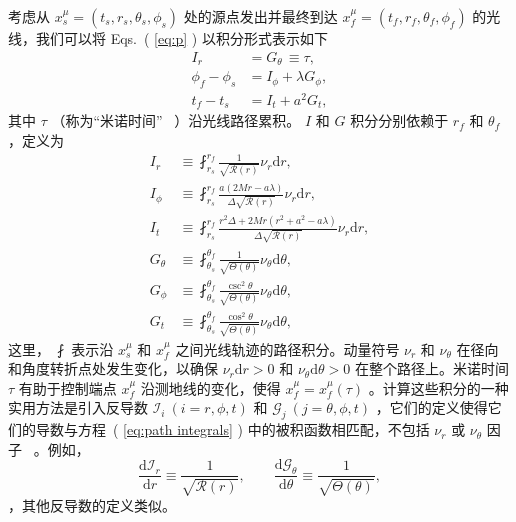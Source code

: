 \documentclass[aps,reprint,superscriptaddress,nofootinbib,floatfix,longbibliography,preprintnumbers]{revtex4-1}
\newcommand{\R}{\mathcal{R}}
\newcommand{\I}{\mathcal{I}}
\newcommand{\G}{\mathcal{G}}
\newcommand{\dd}{\mathrm{d}}
\begin{document}
考虑从    $x^{\mu}_s=(t_s, r_s, \theta_s, \phi_s)$    处的源点发出并最终到达    $x^{\mu}_f=(t_f, r_f, \theta_f, \phi_f)$    的光线，我们可以将 Eqs.~(    \ref{eq:p}    ) 以积分形式表示如下
   \begin{subequations}
    \begin{align}
        I_r&=G_{\theta} \,\equiv\tau,\label{eq:inteq1}  \\ 
        \phi_f-\phi_s&=I_{\phi}+\lambda G_{\phi},\label{eq:inteq2}  \\ 
        t_f-t_s&=I_t +a^2 G_{t}, \label{eq:inteq3}
    \end{align}
\label{eq:integral form}
\end{subequations}    其中    $\tau$    （称为“米诺时间”~    \cite{Mino:2003yg}    ）沿光线路径累积。    $I$    和    $G$    积分分别依赖于    $r_f$    和    $\theta_f$    ，定义为
   \begin{subequations}
    \begin{align}
        I_r&\equiv\fint_{r_s}^{r_f}\frac{1}{\sqrt{\mathcal{R}(r)}}\nu_r\dd r, \label{eq:Ir} \\ 
        I_{\phi}&\equiv\fint_{r_s}^{r_f}\frac{a(2Mr-a\lambda)}{\Delta\sqrt{\R(r)}}\nu_r\dd r, \label{eq:Iphi} \\ 
        I_{t}&\equiv\fint_{r_s}^{r_f}\frac{r^2\Delta+2Mr(r^2+a^2-a\lambda)}{\Delta\sqrt{\R(r)}}\nu_r\dd r, \label{eq:It} \\ 
        G_{\theta}&\equiv\fint_{\theta_s}^{\theta_f}\frac{1}{\sqrt{\Theta(\theta)}}\nu_{\theta}\dd \theta, \label{eq:Gtheta} \\ 
        G_{\phi}&\equiv\fint_{\theta_s}^{\theta_f}\frac{\csc^2\theta}{\sqrt{\Theta(\theta)}}\nu_{\theta} \dd \theta, \label{eq:Gphi} \\ 
        G_{t}&\equiv\fint_{\theta_s}^{\theta_f}\frac{\cos^2\theta}{\sqrt{\Theta(\theta)}}\nu_{\theta} \dd \theta, \label{eq:Gt}
    \end{align}
    \label{eq:path integrals}
\end{subequations}    这里，   $\fint$    表示沿    $x_s^{\mu}$    和    $x_f^{\mu}$    之间光线轨迹的路径积分。动量符号    $\nu_r$    和    $\nu_\theta$    在径向和角度转折点处发生变化，以确保    $\nu_r \dd r > 0$    和    $\nu_\theta \dd\theta > 0$    在整个路径上。米诺时间    $\tau$    有助于控制端点    $x_f^{\mu}$    沿测地线的变化，使得    $x^{\mu}_f=x^{\mu}_f(\tau)$    。计算这些积分的一种实用方法是引入反导数    $\I_i \  (i=r,\phi,t)$    和    $\G_j \  (j=\theta,\phi,t)$    ，它们的定义使得它们的导数与方程~(    \ref{eq:path integrals}    ) 中的被积函数相匹配，不包括    $\nu_r$    或    $\nu_\theta$    因子~    \cite{Gralla:2019ceu,Gralla:2019drh}    。例如，
   \begin{equation}
    \frac{\dd \I_r}{\dd r}\equiv\frac{1}{\sqrt{\R(r)}},
\qquad
    \frac{\dd \G_{\theta}}{\dd \theta}\equiv\frac{1}{\sqrt{\Theta(\theta)}},
\end{equation}    ，其他反导数的定义类似。  
\end{document}
